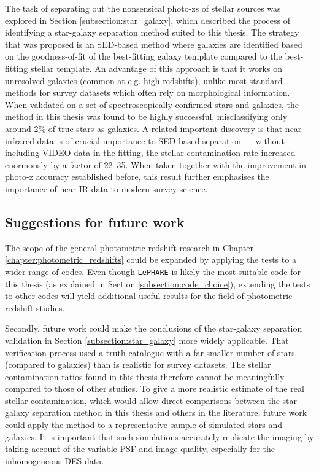 The task of separating out the nonsensical photo-zs of stellar sources was explored in Section \ref{subsection:star_galaxy}, which described the process of identifying a star-galaxy separation method suited to this thesis. The strategy that was proposed is an SED-based method where galaxies are identified based on the goodness-of-fit of the best-fitting galaxy template compared to the best-fitting stellar template. An advantage of this approach is that it works on unresolved galaxies (common at e.g. high redshifts), unlike most standard methods for survey datasets which often rely on morphological information. When validated on a set of spectroscopically confirmed stars and galaxies, the method in this thesis was found to be highly successful, misclassifying only around 2\% of true stars as galaxies. A related important discovery is that near-infrared data is of crucial importance to SED-based separation --- without including VIDEO data in the fitting, the stellar contamination rate increased enormously by a factor of \numrange{22}{35}. When taken together with the improvement in photo-z accuracy established before, this result further emphasises the importance of near-IR data to modern survey science. \par 


\subsection{Suggestions for future work}
The scope of the general photometric redshift research in Chapter \ref{chapter:photometric_redshifts} could be expanded by applying the \DESVIDEO tests to a wider range of codes. Even though \texttt{LePHARE} is likely the most suitable code for this thesis (as explained in Section \ref{subsection:code_choice}), extending the tests to other codes will yield additional useful results for the field of photometric redshift studies. \par 

Secondly, future work could make the conclusions of the star-galaxy separation validation in  Section \ref{subsection:star_galaxy} more widely applicable. That verification process used a truth catalogue with a far smaller number of stars (compared to galaxies) than is realistic for survey datasets. The stellar contamination ratios found in this thesis therefore cannot be meaningfully compared to those of other studies. To give a more realistic estimate of the real stellar contamination, which would allow direct comparisons between the star-galaxy separation method in this thesis and others in the literature, future work could apply the method to a representative sample of simulated stars and galaxies. It is important that such simulations accurately replicate the \DESVIDEO imaging by taking account of the variable PSF and image quality, especially for the inhomogeneous DES data. \par 





